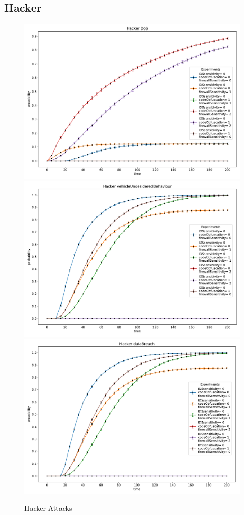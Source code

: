 \subsection*{Hacker}
\begin{figure}[H]
    \begin{center}
        \includegraphics[scale=0.3]{img/Hacker_DoS.pdf}
        \includegraphics[scale=0.3]{img/Hacker_vOB.pdf}
        \includegraphics[scale=0.3]{img/Hacker_dataBreach.pdf}
    \end{center}
    \caption{Hacker Attacks}
    \label{fig:Hacker_Attacks}
    \vspace*{-0.4cm}
\end{figure}